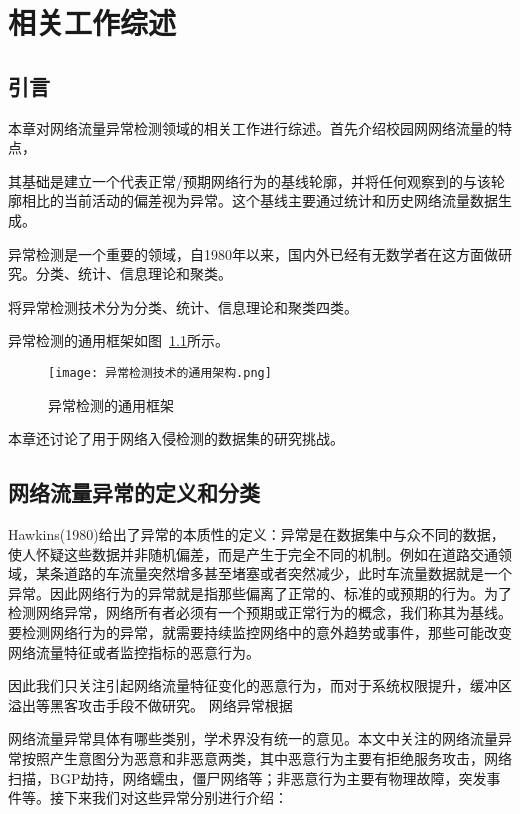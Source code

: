 
\chapter{相关工作综述}

\section{引言}

本章对网络流量异常检测领域的相关工作进行综述。首先介绍校园网网络流量的特点，

其基础是建立一个代表正常/预期网络行为的基线轮廓，并将任何观察到的与该轮廓相比的当前活动的偏差视为异常。这个基线主要通过统计和历史网络流量数据生成。


异常检测是一个重要的领域，自1980年以来，国内外已经有无数学者在这方面做研究。分类、统计、信息理论和聚类。

\citet{ahmed2016survey}将异常检测技术分为分类、统计、信息理论和聚类四类。

异常检测的通用框架如图~\ref{fig:scheme}所示。

\begin{figure}
    \centering
    \texttt{[image: 异常检测技术的通用架构.png]}
    \caption{异常检测的通用框架}
    \label{fig:scheme}
  \end{figure}

本章还讨论了用于网络入侵检测的数据集的研究挑战。



\section{网络流量异常的定义和分类}
Hawkins(1980)给出了异常的本质性的定义\cite{hawkins1980identification}：异常是在数据集中与众不同的数据，使人怀疑这些数据并非随机偏差，而是产生于完全不同的机制。例如在道路交通领域，某条道路的车流量突然增多甚至堵塞或者突然减少，此时车流量数据就是一个异常。因此网络行为的异常就是指那些偏离了正常的、标准的或预期的行为。为了检测网络异常，网络所有者必须有一个预期或正常行为的概念，我们称其为基线。要检测网络行为的异常，就需要持续监控网络中的意外趋势或事件，那些可能改变网络流量特征或者监控指标的恶意行为。


因此我们只关注引起网络流量特征变化的恶意行为，而对于系统权限提升，缓冲区溢出等黑客攻击手段不做研究。
网络异常根据

网络流量异常具体有哪些类别，学术界没有统一的意见。本文中关注的网络流量异常按照产生意图分为恶意和非恶意两类，其中恶意行为主要有拒绝服务攻击，网络扫描，BGP劫持，网络蠕虫，僵尸网络等；非恶意行为主要有物理故障，突发事件等。接下来我们对这些异常分别进行介绍：

